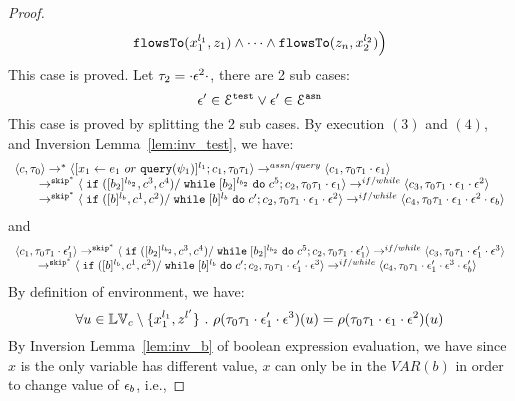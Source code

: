 {\begin{proof}
\[  \mathtt{flowsTo}(x_1^{l_1}, z_1) 
  \land \cdots \land \mathtt{flowsTo}(z_n, x_2^{l_2}) \Big)
 \]
 This case is proved.
%
 Let $\mathtt{\tau}_2 = \cdot \mathtt{\epsilon}^2 \cdot$, there are 2 sub cases: 
 \[
 \mathtt{\epsilon}' \in \mathcal{E}^{\mathtt{{test}}} \lor \mathtt{\epsilon}' \in \mathcal{E}^{\mathtt{{asn}}}
 \]
 This case is proved by splitting the 2 sub cases.
 \subcaseL{$\event^2 \in \eventset^{\test}$}
By execution $(3)$ and $(4)$, and {Inversion Lemma~\ref{lem:inv_test}}, we have:
%
\[
  \begin{array}{l}   
  \langle {c}, \mathtt{\tau}_0 \rangle 
  \rightarrow^{*} 
  \langle [\mathrel{ {x}_1 \leftarrow e_1~ or ~ {\tt query}(\psi_1) }]^{l_1} ; {c}_1, \mathtt{\tau}_0 \mathtt{\tau}_1 \rangle  \rightarrow^{assn/query}
 \langle c_1, \mathtt{\tau}_0 \mathtt{\tau}_1 \cdot \mathtt{\epsilon}_1 \rangle 
  \\ 
  \qquad \rightarrow^{\mathtt{skip}^*} 
  \langle \;\mathtt{if}\;([b_2]{}^{l_{b_2}}, c^3, c^4) / \;\mathtt{while}\; [b_2]{}^{l_{b_2}} \;\mathtt{do}\; c^5; {c}_2, 
  \mathtt{\tau}_0 \mathtt{\tau}_1 \cdot \mathtt{\epsilon}_1 \rangle 
  \rightarrow^{if / while} 
  \langle {c}_3,  \mathtt{\tau}_0 \mathtt{\tau}_1 \cdot \mathtt{\epsilon}_1 \cdot \mathtt{\epsilon}^2 \rangle 
  \\ 
  \qquad \rightarrow^{\mathtt{skip}^*} 
  \langle \;\mathtt{if}\;([b]{}^{l_b}, c^1, c^2) / \;\mathtt{while}\; [b]{}^{l_b} \;\mathtt{do}\; c'; {c}_2, 
  \mathtt{\tau}_0 \mathtt{\tau}_1 \cdot \mathtt{\epsilon}_1\cdot \mathtt{\epsilon}^2 \rangle 
  \rightarrow^{if / while} 
  \langle {c}_4,  \mathtt{\tau}_0 \mathtt{\tau}_1 \cdot \mathtt{\epsilon}_1 \cdot \mathtt{\epsilon}^2 \cdot \mathtt{\epsilon}_b \rangle 
\end{array}
 \]
and 
 \[
  \begin{array}{l}   
  \langle c_1, \mathtt{\tau}_0 \mathtt{\tau}_1 \cdot \mathtt{\epsilon}_1' \rangle 
 \rightarrow^{\mathtt{skip}^*} 
  \langle \;\mathtt{if}\;([b_2]{}^{l_{b_2}}, c^3, c^4) / \;\mathtt{while}\; [b_2]{}^{l_{b_2}} \;\mathtt{do}\; c^5; {c}_2, 
  \mathtt{\tau}_0 \mathtt{\tau}_1 \cdot \mathtt{\epsilon}_1' \rangle 
  \rightarrow^{if / while} 
  \langle {c}_3,  \mathtt{\tau}_0 \mathtt{\tau}_1 \cdot \mathtt{\epsilon}_1' \cdot \mathtt{\epsilon}^3 \rangle 
  \\ 
  \qquad \rightarrow^{\mathtt{skip}^*} 
  \langle \;\mathtt{if}\;([b]{}^{l_b}, c^1, c^2) / \;\mathtt{while}\; [b]{}^{l_b} \;\mathtt{do}\; c'; {c}_2, 
  \mathtt{\tau}_0 \mathtt{\tau}_1 \cdot \mathtt{\epsilon}_1' \cdot \mathtt{\epsilon}^3 \rangle 
  \rightarrow^{if / while} 
  \langle {c}_4,  \mathtt{\tau}_0 \mathtt{\tau}_1 \cdot \mathtt{\epsilon}_1' \cdot \mathtt{\epsilon}^3 \cdot \mathtt{\epsilon}_b' \rangle 
\end{array}
 \]
 By definition of environment, we have:
\[
  \forall u \in \mathbb{LV}_c \setminus \{x_1^{l_1}, z^{l'}\} ~.~
  \rho(\mathtt{\tau}_0 \mathtt{\tau}_1 \cdot \mathtt{\epsilon}_1' \cdot \mathtt{\epsilon}^3) (u) =  
  \rho(\mathtt{\tau}_0 \mathtt{\tau}_1 \cdot \mathtt{\epsilon}_1 \cdot \mathtt{\epsilon}^2) (u)
\]
%
By {Inversion Lemma~\ref{lem:inv_b}} of boolean expression evaluation, we have since $x$ is the only variable has different value, $x$ can only be in the $VAR(b)$ in order to change value of $\mathtt{\epsilon}_b$, i.e.,

\end{proof}}
